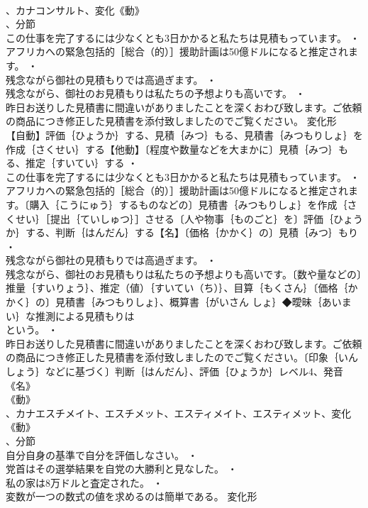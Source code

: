 \documentclass[8pt]{extreport}
\begin{document}
\begin{CJK}{UTF8}{min}
\\	、カナコンサルト、変化《動》
\\	、分節
\\	この仕事を完了するには少なくとも3日かかると私たちは見積もっています。 ・
\\	アフリカへの緊急包括的［総合（的）］援助計画は50億ドルになると推定されます。 ・
\\	残念ながら御社の見積もりでは高過ぎます。 ・
\\	残念ながら、御社のお見積もりは私たちの予想よりも高いです。 ・
\\	昨日お送りした見積書に間違いがありましたことを深くおわび致します。ご依頼の商品につき修正した見積書を添付致しましたのでご覧ください。	変化形 
\\	【自動】評価｛ひょうか｝する、見積｛みつ｝もる、見積書｛みつもりしょ｝を作成｛さくせい｝する【他動】〔程度や数量などを大まかに〕見積｛みつ｝もる、推定｛すいてい｝する ・
\\	この仕事を完了するには少なくとも3日かかると私たちは見積もっています。 ・
\\	アフリカへの緊急包括的［総合（的）］援助計画は50億ドルになると推定されます。〔購入｛こうにゅう｝するものなどの〕見積書｛みつもりしょ｝を作成｛さくせい｝［提出｛ていしゅつ｝］させる〔人や物事｛ものごと｝を〕評価｛ひょうか｝する、判断｛はんだん｝する【名】〔価格｛かかく｝の〕見積｛みつ｝もり ・
\\	残念ながら御社の見積もりでは高過ぎます。 ・
\\	残念ながら、御社のお見積もりは私たちの予想よりも高いです。〔数や量などの〕推量｛すいりょう｝、推定（値）｛すいてい（ち）｝、目算｛もくさん｝〔価格｛かかく｝の〕見積書｛みつもりしょ｝、概算書｛がいさん しょ｝◆曖昧｛あいまい｝な推測による見積もりは
\\	という。 ・
\\	昨日お送りした見積書に間違いがありましたことを深くおわび致します。ご依頼の商品につき修正した見積書を添付致しましたのでご覧ください。〔印象｛いんしょう｝などに基づく〕判断｛はんだん｝、評価｛ひょうか｝レベル4、発音《名》
\\	《動》
\\	、カナエスチメイト、エスチメット、エスティメイト、エスティメット、変化《動》
\\	、分節
\\	自分自身の基準で自分を評価しなさい。 ・
\\	党首はその選挙結果を自党の大勝利と見なした。 ・
\\	私の家は8万ドルと査定された。 ・
\\	変数が一つの数式の値を求めるのは簡単である。	変化形 

\end{CJK}
\end{document}
